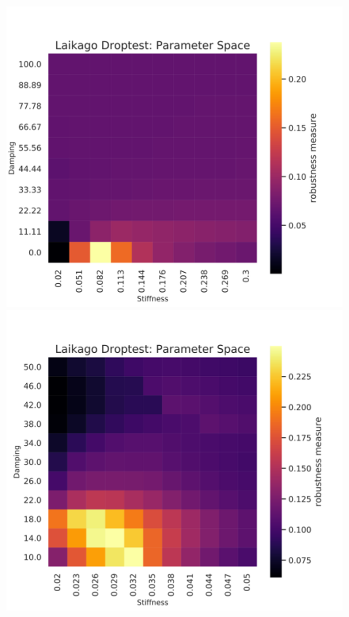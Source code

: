     \begin{figure}[h]
        \centering
        \begin{minipage}{0.33\textwidth}
            \centering
            \includegraphics[width=\textwidth]{figures/droptest_ps_full_v2.png} %
        \end{minipage}\hfill
        \begin{minipage}{0.33\textwidth}
            \centering
            \includegraphics[width=\textwidth]{figures/droptest_ps_zoom1_v2.png} %

\end{minipage}
\end{figure}
